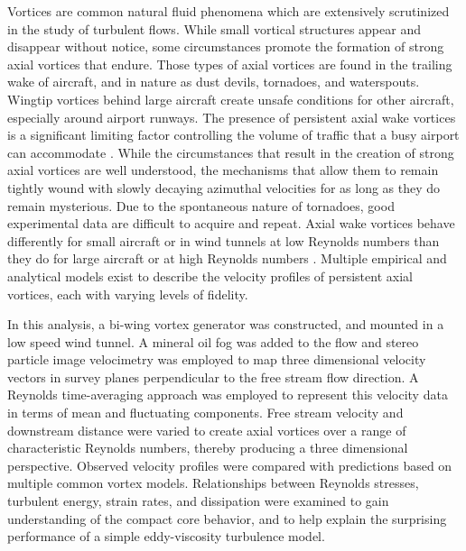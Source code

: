 Vortices are common natural fluid phenomena which are extensively scrutinized 
in the study of turbulent flows. While small vortical structures appear and 
disappear without notice, some circumstances promote the formation of strong 
axial vortices that endure. Those types of axial vortices are found in the 
trailing wake of aircraft, and in nature as dust devils, tornadoes, and 
waterspouts. Wingtip vortices behind large aircraft create unsafe conditions 
for other aircraft, especially around airport runways. The presence of 
persistent axial wake vortices is a significant limiting factor controlling the 
volume of traffic that a busy airport can accommodate \cite{hallock1991}. While 
the circumstances that result 
in the creation of strong axial vortices are well understood, the mechanisms 
that allow them to remain tightly wound with slowly decaying azimuthal 
velocities for as long as they do remain mysterious. 
Due to the spontaneous nature of tornadoes, good experimental data are 
difficult 
to acquire and repeat. Axial wake vortices behave differently for 
small aircraft or in wind tunnels at low Reynolds numbers than they do for 
large aircraft or at high Reynolds numbers \cite{burnam2013}. Multiple 
empirical and analytical models exist to describe the velocity profiles of 
persistent axial vortices, each with varying levels of fidelity.

In this analysis, a bi-wing vortex generator was constructed, and mounted in 
a low speed wind tunnel. A mineral oil fog was added to the flow and stereo 
particle image velocimetry was employed to map three dimensional velocity 
vectors in survey planes perpendicular to the free stream flow direction. A 
Reynolds time-averaging approach was employed to represent this velocity data 
in terms of mean and fluctuating components. Free stream velocity and 
downstream distance were varied to create axial vortices over a range of 
characteristic Reynolds numbers, thereby producing a three dimensional 
perspective. Observed velocity profiles were compared with predictions based on 
multiple common vortex models. Relationships between 
Reynolds stresses, turbulent energy, strain rates, and dissipation were
examined to gain understanding of the compact core behavior, and to help 
explain the surprising performance of a simple eddy-viscosity turbulence model.